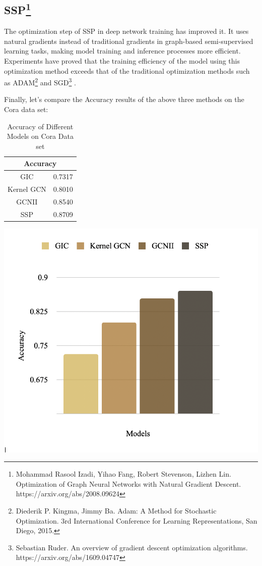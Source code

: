 \documentclass[11pt]{article}
\begin{document}
\subsection{SSP\footnote{Mohammad Rasool Izadi, Yihao Fang, Robert Stevenson, Lizhen Lin. Optimization of Graph Neural Networks with Natural Gradient Descent. https://arxiv.org/abs/2008.09624}} 

The optimization step of SSP in deep network training has improved it. It uses natural gradients instead of traditional gradients in graph-based semi-supervised learning tasks, making model training and inference processes more efficient. Experiments have proved that the training efficiency of the model using this optimization method exceeds that of the traditional optimization methods such as ADAM\footnote{Diederik P. Kingma, Jimmy Ba. Adam: A Method for Stochastic Optimization. 3rd International Conference for Learning Representations, San Diego, 2015.}  and SGD\footnote{Sebastian Ruder. An overview of gradient descent optimization algorithms. https://arxiv.org/abs/1609.04747} .

Finally, let's compare the Accuracy results of the above three methods on the Cora  data set:
\begin{table}[H]
	\centering	
	\parbox{.4\linewidth}{
		\centering
	\begin{tabular}{cc}
		\hline\multicolumn{2}{c}{Accuracy}\\
		\hline
		GIC & 0.7317\\
		Kernel GCN & 0.8010\\
		GCNII & 0.8540\\
		SSP & 0.8709
	\end{tabular}
}
	\parbox{.55\linewidth}{
		\centering
		\includegraphics[width=.5\linewidth]{graphs/Comparison.PNG}
	}	
	
	\caption{Accuracy of Different Models on Cora Data set}
	
\end{table}
\end{document}
